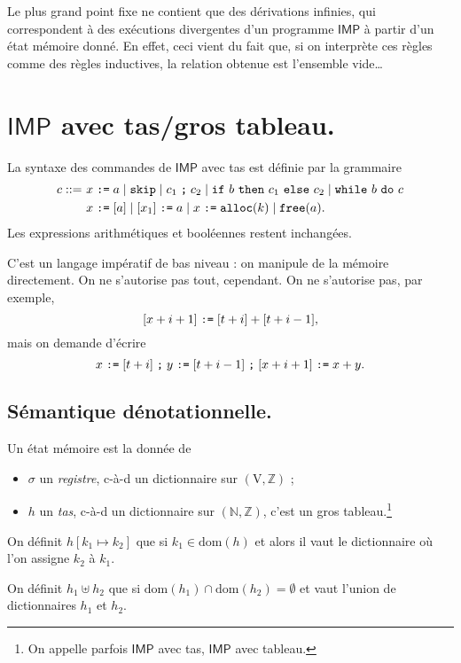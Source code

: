 \documentclass[../main]{subfiles}
\begin{document}
  Le plus grand point fixe ne contient que des dérivations infinies, qui correspondent à des exécutions divergentes d’un programme $\mathsf{IMP}$ à partir d’un état mémoire donné.
  En effet, ceci vient du fait que, si on interprète ces règles comme des règles inductives, la relation obtenue est l'ensemble vide\ldots


  \section{$\mathsf{IMP}$ avec tas/gros tableau.}

  La syntaxe des commandes de $\mathsf{IMP}$ avec tas est définie par la grammaire 
  \begin{align*}
    c ::= \ &x \mathrel{\texttt{:=}} a  \mid \texttt{skip}  \mid c_1 \mathrel{\texttt{;}} c_2  \mid \texttt{if}\ b\ \texttt{then}\ c_1\ \texttt{else}\ c_2  \mid \texttt{while}\ b\ \texttt{do}\ c\\
          &x \mathrel{\texttt{:=}} [a]  \mid [x_1] \mathrel{\texttt{:=}} a  \mid x \mathrel{\texttt{:=}} \texttt{alloc}(k)  \mid \texttt{free}(a).
  \end{align*}
  Les expressions arithmétiques et booléennes restent inchangées.

  \begin{rmk}
    C'est un langage impératif de bas niveau : on manipule de la mémoire directement.
    On ne s'autorise pas tout, cependant. On ne s'autorise pas, par exemple, \[
      [x + i + 1] \mathrel{\texttt{:=}} [t + i] + [t + i - 1]
    ,\] mais on demande d'écrire \[
      x \mathrel{\texttt{:=}} [t+i]\mathrel{\texttt{;}} y \mathrel{\texttt{:=}} [t + i - 1] \mathrel{\texttt{;}} [x + i + 1] \mathrel{\texttt{:=}} x + y
    .\]
  \end{rmk}

  \subsection{Sémantique dénotationnelle.}

  \begin{defn}
    Un état mémoire est la donnée de 
    \begin{itemize}
      \item $\sigma$ un \textit{registre}, c-à-d un dictionnaire sur $(\mathrm{V}, \mathds{Z})$ ;
      \item $h$ un \textit{tas}, c-à-d un dictionnaire sur $(\mathds{N}, \mathds{Z})$, c'est un gros tableau.\footnote{On appelle parfois $\mathsf{IMP}$ avec tas, $\mathsf{IMP}$ avec tableau.}
    \end{itemize}

    On définit $h[k_1 \mapsto k_2]$ que si $k_1 \in \mathrm{dom}(h)$ et alors il vaut le dictionnaire où l'on assigne $k_2$ à $k_1$.
    
    On définit $h_1 \uplus h_2$ que si $\mathrm{dom}(h_1) \cap \mathrm{dom}(h_2) = \emptyset$ et vaut l'union de dictionnaires $h_1$ et $h_2$.
  \end{defn}
\end{document}
